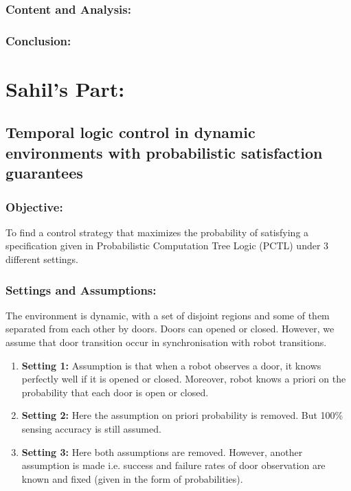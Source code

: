 \documentclass{article}
\theoremstyle{definition}
\begin{document}
\subsubsection{Content and Analysis:}

\subsubsection{Conclusion:}


\section{Sahil's Part:}
\subsection{Temporal logic control in dynamic environments with probabilistic satisfaction guarantees}
\subsubsection{Objective:}
To find a control strategy that maximizes the
probability of satisfying a specification given in Probabilistic
Computation Tree Logic (PCTL) under 3 different settings.
\subsubsection{Settings and Assumptions:}
The environment is dynamic, with a set of disjoint regions and some of them separated from each other by doors. Doors can opened or closed.
However, we assume that door transition occur in synchronisation with robot transitions.
\begin{enumerate}
    \item \textbf{Setting 1:}
        Assumption is that when a robot observes a door, it knows perfectly well if it is opened or closed. Moreover, robot knows a priori on the probability that each door is open or closed.
    \item \textbf{Setting 2:}
        Here the assumption on priori probability is removed. But 100\% sensing accuracy is still assumed.
    \item \textbf{Setting 3:}
        Here both assumptions are removed. However, another assumption is made i.e. success and failure rates of door observation are known and fixed (given in the form of probabilities).
\end{enumerate}
\end{document}
